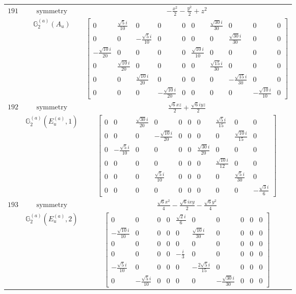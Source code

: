 \documentclass[fleqn,8pt,landscape]{jsarticle}
\begin{document}
\begin{longtable}{ccc}
$ 191 $ & $ \text{symmetry} $ & $ - \frac{x^{2}}{2} - \frac{y^{2}}{2} + z^{2} $ \\
$  $ & $ \mathbb{G}_{2}^{(a)}(A_{u}) $ & $ \begin{bmatrix} 0 & \frac{\sqrt{5} i}{10} & 0 & 0 & 0 & 0 & \frac{\sqrt{30} i}{30} & 0 & 0 & 0 \\ 0 & 0 & - \frac{\sqrt{5} i}{10} & 0 & 0 & 0 & 0 & \frac{\sqrt{30} i}{30} & 0 & 0 \\ - \frac{\sqrt{10} i}{20} & 0 & 0 & 0 & 0 & \frac{\sqrt{10} i}{10} & 0 & 0 & 0 & 0 \\ 0 & \frac{\sqrt{10} i}{20} & 0 & 0 & 0 & 0 & \frac{\sqrt{15} i}{30} & 0 & 0 & 0 \\ 0 & 0 & \frac{\sqrt{10} i}{20} & 0 & 0 & 0 & 0 & - \frac{\sqrt{15} i}{30} & 0 & 0 \\ 0 & 0 & 0 & - \frac{\sqrt{10} i}{20} & 0 & 0 & 0 & 0 & - \frac{\sqrt{10} i}{10} & 0 \end{bmatrix} $ \\ \hline
$ 192 $ & $ \text{symmetry} $ & $ \frac{\sqrt{6} x z}{2} + \frac{\sqrt{6} i y z}{2} $ \\
$  $ & $ \mathbb{G}_{2}^{(a)}(E_{u}^{(a)},1) $ & $ \begin{bmatrix} 0 & 0 & \frac{\sqrt{30} i}{20} & 0 & 0 & 0 & 0 & \frac{\sqrt{5} i}{15} & 0 & 0 \\ 0 & 0 & 0 & - \frac{\sqrt{10} i}{20} & 0 & 0 & 0 & 0 & \frac{\sqrt{10} i}{15} & 0 \\ 0 & - \frac{\sqrt{5} i}{10} & 0 & 0 & 0 & 0 & \frac{\sqrt{30} i}{20} & 0 & 0 & 0 \\ 0 & 0 & 0 & 0 & 0 & 0 & 0 & \frac{\sqrt{10} i}{12} & 0 & 0 \\ 0 & 0 & 0 & \frac{\sqrt{5} i}{10} & 0 & 0 & 0 & 0 & \frac{\sqrt{5} i}{30} & 0 \\ 0 & 0 & 0 & 0 & 0 & 0 & 0 & 0 & 0 & - \frac{\sqrt{3} i}{6} \end{bmatrix} $ \\ \hline
$ 193 $ & $ \text{symmetry} $ & $ \frac{\sqrt{6} x^{2}}{4} - \frac{\sqrt{6} i x y}{2} - \frac{\sqrt{6} y^{2}}{4} $ \\
$  $ & $ \mathbb{G}_{2}^{(a)}(E_{u}^{(a)},2) $ & $ \begin{bmatrix} 0 & 0 & 0 & 0 & \frac{\sqrt{2} i}{6} & 0 & 0 & 0 & 0 & 0 \\ - \frac{\sqrt{10} i}{10} & 0 & 0 & 0 & 0 & \frac{\sqrt{10} i}{30} & 0 & 0 & 0 & 0 \\ 0 & 0 & 0 & 0 & 0 & 0 & 0 & 0 & 0 & 0 \\ 0 & 0 & 0 & 0 & - \frac{i}{3} & 0 & 0 & 0 & 0 & 0 \\ - \frac{\sqrt{5} i}{10} & 0 & 0 & 0 & 0 & - \frac{2 \sqrt{5} i}{15} & 0 & 0 & 0 & 0 \\ 0 & - \frac{\sqrt{5} i}{10} & 0 & 0 & 0 & 0 & - \frac{\sqrt{30} i}{30} & 0 & 0 & 0 \end{bmatrix} $ \\ \hline

\end{longtable}
\end{document}
